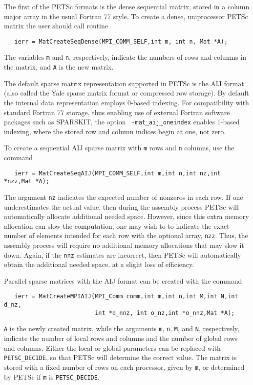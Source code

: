The first of the PETSc formats is the dense sequential matrix,
stored in a column major array in the usual Fortran 77 style. 
To create a dense, uniprocessor PETSc matrix the user should call
routine 
\begin{verbatim}
   ierr = MatCreateSeqDense(MPI_COMM_SELF,int m, int n, Mat *A);
\end{verbatim}
The variables {\tt m} and {\tt n}, respectively, indicate the numbers
of rows and columns in the matrix, and {\tt A} is the new matrix.

The default sparse matrix representation supported in PETSc is the AIJ
 format (also called the Yale sparse matrix
format or compressed row storage). By default the internal data
representation employs 0-based indexing.  For compatibility with
standard Fortran 77 storage, thus enabling use of external Fortran
software packages such as SPARSKIT,  the option {\tt
-mat\_aij\_oneindex}  enables 1-based indexing, 
where the stored row and column indices begin at one, not zero.

To create a sequential AIJ sparse matrix 
with {\tt m} rows and {\tt n} columns, use the command
\begin{verbatim}
   ierr = MatCreateSeqAIJ(MPI_COMM_SELF,int m,int n,int nz,int *nzz,Mat *A);
\end{verbatim}
The argument {\tt nz} indicates the expected number of nonzeros 
in each row. If one underestimates the actual value, then during the 
assembly process PETSc will automatically allocate additional needed space. 
However, since this extra memory allocation can slow the computation,
one may wish to to indicate the exact number of elements intended for
each row with the optional array, {\tt nzz}.  Thus, the assembly process 
will require no additional memory allocations that may slow it down. Again, if
the {\tt nnz} estimates are incorrect, then PETSc will automatically obtain
the additional needed space, at a slight loss of efficiency. 

Parallel sparse matrices with the AIJ 
format can be created with the command 
\begin{verbatim}
   ierr = MatCreateMPIAIJ(MPI_Comm comm,int m,int n,int M,int N,int d_nz,
                          int *d_nnz, int o_nz,int *o_nnz,Mat *A);
\end{verbatim}
{\tt A} is the newly created matrix, while the arguments {\tt m}, {\tt n}, 
{\tt M}, and {\tt N}, respectively, indicate the number of local rows and 
columns and the number of global rows and columns. Either the local or
global parameters can be replaced with {\tt PETSC\_DECIDE}, so that 
PETSc will determine 
the correct value. The matrix is stored with a fixed number of rows on 
each processor, given by {\tt m}, or determined by PETSc if {\tt m} is
{\tt PETSC\_DECIDE}. 

